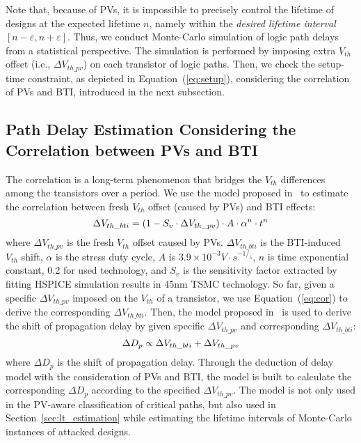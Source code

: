 Note that, because of PVs, it is impossible to precisely control the lifetime of designs at the expected lifetime $n$, namely within the \textit{desired lifetime interval}  $[n - \varepsilon, n + \varepsilon]$. Thus, we conduct Monte-Carlo simulation of logic path delays from a statistical perspective. The simulation is performed by imposing extra $V_{th}$ offset (i.e., $\Delta V_{th\_pv}$) on each transistor of logic paths. Then, we check the setup-time constraint, as depicted in Equation~(\ref{eq:setup}), considering the correlation of PVs and BTI, introduced in the next subsection. 

\subsection{Path Delay Estimation Considering the Correlation between PVs and BTI}
\label{sec:frame:cor}
The correlation is a long-term phenomenon that bridges the $V_{th}$ differences among the transistors over a period. %
We use the model proposed in~\cite{gomez2016early} to estimate the correlation between fresh $V_{th}$ offset (caused by PVs) and BTI effects:
\begin{equation}
	\centering
	\fontsize{9}{9} \selectfont
	\Delta V_{th\_bti} = (1 - S_{v} \cdot \Delta V_{th\_pv})  \cdot A \cdot \alpha^n \cdot t^n
	\label{eq:cor}
\end{equation}
where $\Delta V_{th\_pv}$ is the fresh $V_{th}$ offset caused by PVs. $\Delta V_{th\_bti}$ is the BTI-induced $V_{th}$ shift, $\alpha$ is the stress duty cycle, $A$ is $3.9 \times 10^{-3} V \cdot s^{-1/_5}$, $n$ is time exponential constant, 0.2 for used technology, and $S_{v}$ is the sensitivity factor extracted by fitting HSPICE simulation results in 45nm TSMC technology. So far, given a specific $\Delta V_{th\_pv}$ imposed on the $V_{th}$ of a transistor, we use Equation~(\ref{eq:cor}) to derive the corresponding $\Delta V_{th\_bti}$. Then, the model proposed in~\cite{wang2007efficient} is used to derive the shift of propagation delay by given specific $\Delta V_{th\_pv}$ and corresponding $\Delta V_{th\_bti}$:
\begin{equation}
	\centering
	\fontsize{9}{9} \selectfont
	\Delta D_{p} \propto \Delta V_{th\_bti} + \Delta V_{th\_pv}
	\label{eq:vtodelay}
\end{equation}	
where $\Delta D_{p}$ is the shift of propagation delay. Through the deduction of delay model with the consideration of PVs and BTI, the model is built to calculate the corresponding $\Delta D_{p}$ according to the specified $\Delta V_{th\_pv}$. The model is not only used in the PV-aware classification of critical paths, but also used in Section~\ref{sec:lt_estimation} while estimating the lifetime intervals of Monte-Carlo instances of attacked designs. 
